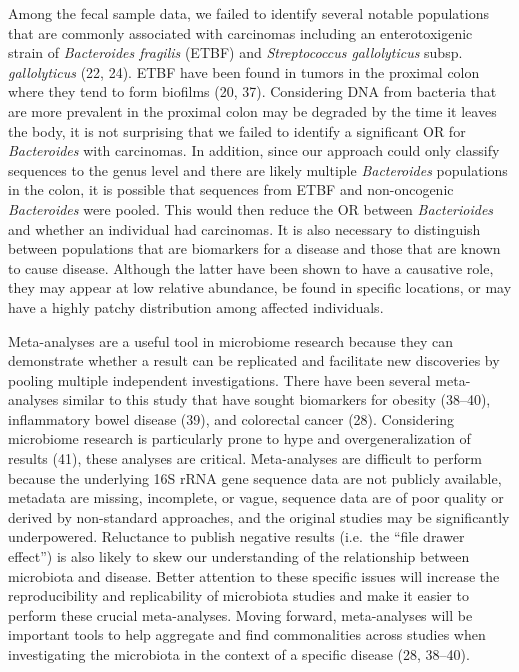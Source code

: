 \documentclass[12pt,]{article}
\begin{document}
Among the fecal sample data, we failed to identify several notable
populations that are commonly associated with carcinomas including an
enterotoxigenic strain of \emph{Bacteroides fragilis} (ETBF) and
\emph{Streptococcus gallolyticus} subsp. \emph{gallolyticus} (22, 24).
ETBF have been found in tumors in the proximal colon where they tend to
form biofilms (20, 37). Considering DNA from bacteria that are more
prevalent in the proximal colon may be degraded by the time it leaves
the body, it is not surprising that we failed to identify a significant
OR for \emph{Bacteroides} with carcinomas. In addition, since our
approach could only classify sequences to the genus level and there are
likely multiple \emph{Bacteroides} populations in the colon, it is
possible that sequences from ETBF and non-oncogenic \emph{Bacteroides}
were pooled. This would then reduce the OR between \emph{Bacterioides}
and whether an individual had carcinomas. It is also necessary to
distinguish between populations that are biomarkers for a disease and
those that are known to cause disease. Although the latter have been
shown to have a causative role, they may appear at low relative
abundance, be found in specific locations, or may have a highly patchy
distribution among affected individuals.

Meta-analyses are a useful tool in microbiome research because they can
demonstrate whether a result can be replicated and facilitate new
discoveries by pooling multiple independent investigations. There have
been several meta-analyses similar to this study that have sought
biomarkers for obesity (38--40), inflammatory bowel disease (39), and
colorectal cancer (28). Considering microbiome research is particularly
prone to hype and overgeneralization of results (41), these analyses are
critical. Meta-analyses are difficult to perform because the underlying
16S rRNA gene sequence data are not publicly available, metadata are
missing, incomplete, or vague, sequence data are of poor quality or
derived by non-standard approaches, and the original studies may be
significantly underpowered. Reluctance to publish negative results
(i.e.~the ``file drawer effect'') is also likely to skew our
understanding of the relationship between microbiota and disease. Better
attention to these specific issues will increase the reproducibility and
replicability of microbiota studies and make it easier to perform these
crucial meta-analyses. Moving forward, meta-analyses will be important
tools to help aggregate and find commonalities across studies when
investigating the microbiota in the context of a specific disease (28,
38--40).
\end{document}
